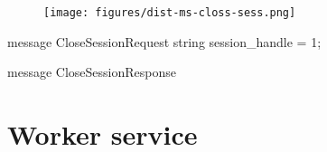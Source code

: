 \begin{content}
\begin{figure}[H]
\centering
\texttt{[image: figures/dist-ms-closs-sess.png]}
\caption{}
 \label{fig:dist-ms-closs-sess}
\end{figure}

\begin{leftbar}
\begin{c++}
message CloseSessionRequest {
  string session_handle = 1;
}

message CloseSessionResponse {
}
\end{c++}
\end{leftbar}

\end{content}

\section{Worker service}

